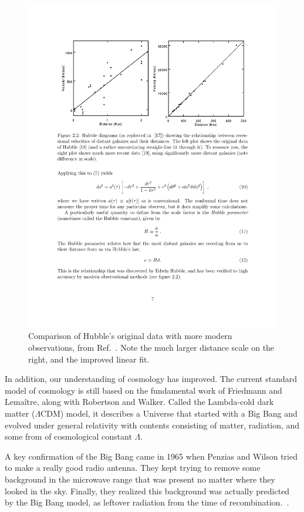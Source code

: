 \documentclass[12pt]{article}
\renewcommand{\L}{$\Lambda$}
\begin{document}
\begin{figure}
\centering
\includegraphics[]{Hubble}
\caption{Comparison of Hubble's original data with more modern observations, from Ref.~\cite{Trodden2004}. Note the much larger distance scale on the right, and the improved linear fit.}
\label{fig:Hubble}
\end{figure}

In addition, our understanding of cosmology has improved. The current standard model of cosmology is still based on the fundamental work of Friedmann and Lema\^itre, along with Robertson and Walker. Called the Lambda-cold dark matter (\L CDM) model, it describes a Universe that started with a Big Bang and evolved under general relativity with contents consisting of matter, radiation, and some from of cosmological constant \L. 

A key confirmation of the Big Bang came in 1965 when Penzias and Wilson tried to make a really good radio antenna. They kept trying to remove some background in the microwave range that was present no matter where they looked in the sky. Finally, they realized this background was actually predicted by the Big Bang model, as leftover radiation from the time of recombination.~\cite{Penzias1965}. 
\end{document}
